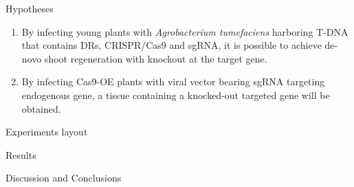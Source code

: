 \documentclass[
  ignorenonframetext,
]{beamer}
\begin{document}
\begin{frame}{Hypotheses}
\protect\hypertarget{hypotheses}{}
\begin{enumerate}
\item
  By infecting young plants with \emph{Agrobacterium tumefaciens}
  harboring T-DNA that contains DRs, CRISPR/Cas9 and sgRNA, it is
  possible to achieve de-novo shoot regeneration with knockout at the
  target gene.
\item
  By infecting Cas9-OE plants with viral vector bearing sgRNA targeting
  endogenous gene, a tissue containing a knocked-out targeted gene will
  be obtained.
\end{enumerate}
\end{frame}

\begin{frame}{Experiments layout}
\protect\hypertarget{experiments-layout}{}
\end{frame}

\begin{frame}{Results}
\protect\hypertarget{results}{}
\end{frame}

\begin{frame}{Discussion and Conclusions}
\protect\hypertarget{discussion-and-conclusions}{}
\end{frame}
\end{document}
